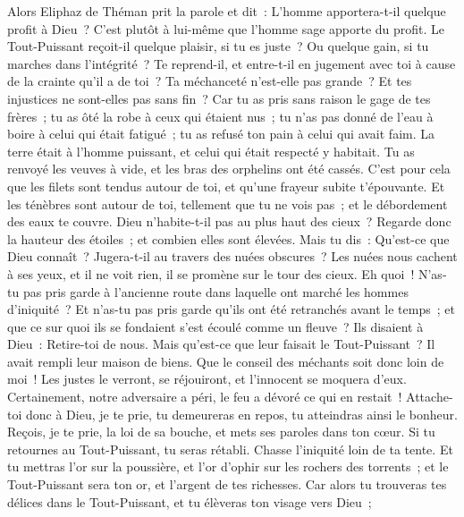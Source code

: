 \begin{multicols}{2}
\VerseOne{}Alors Eliphaz de Théman prit la parole et dit~: 
L'homme apportera-t-il quelque profit à Dieu~? C'est plutôt à lui-même que l'homme sage apporte du profit. 
Le Tout-Puissant reçoit-il quelque plaisir, si tu es juste~? Ou quelque gain, si tu marches dans l'intégrité~?
Te reprend-il, et entre-t-il en jugement avec toi à cause de la crainte qu'il a de toi~? 
Ta méchanceté n'est-elle pas grande~? Et tes injustices ne sont-elles pas sans fin~? 
Car tu as pris sans raison le gage de tes frères~; tu as ôté la robe à ceux qui étaient nus~;
tu n'as pas donné de l'eau à boire à celui qui était fatigué~; tu as refusé ton pain à celui qui avait faim.
La terre était à l'homme puissant, et celui qui était respecté y habitait. 
Tu as renvoyé les veuves à vide, et les bras des orphelins ont été cassés.
C'est pour cela que les filets sont tendus autour de toi, et qu'une frayeur subite t'épouvante. 
Et les ténèbres sont autour de toi, tellement que tu ne vois pas~; et le débordement des eaux te couvre.
Dieu n'habite-t-il pas au plus haut des cieux~? Regarde donc la hauteur des étoiles~; et combien elles sont élevées.
Mais tu dis~: Qu'est-ce que Dieu connaît~? Jugera-t-il au travers des nuées obscures~? 
Les nuées nous cachent à ses yeux, et il ne voit rien, il se promène sur le tour des cieux. 
Eh quoi~! N'as-tu pas pris garde à l'ancienne route dans laquelle ont marché les hommes d'iniquité~?
Et n'as-tu pas pris garde qu'ils ont été retranchés avant le temps~; et que ce sur quoi ils se fondaient s'est écoulé comme un fleuve~?
Ils disaient à Dieu~: Retire-toi de nous. Mais qu'est-ce que leur faisait le Tout-Puissant~?
Il avait rempli leur maison de biens. Que le conseil des méchants soit donc loin de moi~!
Les justes le verront, se réjouiront, et l'innocent se moquera d'eux.
Certainement, notre adversaire a péri, le feu a dévoré ce qui en restait~!
Attache-toi donc à Dieu, je te prie, tu demeureras en repos, tu atteindras ainsi le bonheur.
Reçois, je te prie, la loi de sa bouche, et mets ses paroles dans ton cœur.
Si tu retournes au Tout-Puissant, tu seras rétabli. Chasse l'iniquité loin de ta tente.
Et tu mettras l'or sur la poussière, et l'or d'ophir sur les rochers des torrents~;
et le Tout-Puissant sera ton or, et l'argent de tes richesses.
Car alors tu trouveras tes délices dans le Tout-Puissant, et tu élèveras ton visage vers Dieu~; 

\end{multicols}
